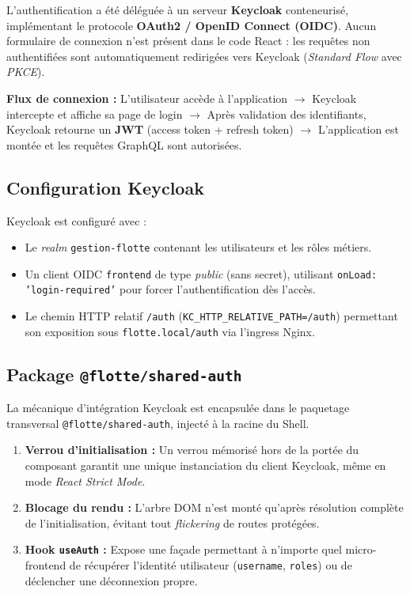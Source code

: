 \documentclass[12pt,a4paper]{article}
\begin{document}
L'authentification a \'{e}t\'{e} d\'{e}l\'{e}gu\'{e}e \`{a} un serveur \textbf{Keycloak} conteneuris\'{e}, impl\'{e}mentant le protocole \textbf{OAuth2 / OpenID Connect (OIDC)}. Aucun formulaire de connexion n'est pr\'{e}sent dans le code React : les requ\^{e}tes non authentifi\'{e}es sont automatiquement redirig\'{e}es vers Keycloak (\textit{Standard Flow} avec \textit{PKCE}).

\begin{infobox}
\textbf{Flux de connexion :} L'utilisateur acc\`{e}de \`{a} l'application $\rightarrow$ Keycloak intercepte et affiche sa page de login $\rightarrow$ Apr\`{e}s validation des identifiants, Keycloak retourne un \textbf{JWT} (access token + refresh token) $\rightarrow$ L'application est mont\'{e}e et les requ\^{e}tes GraphQL sont autoris\'{e}es.
\end{infobox}

\subsection{Configuration Keycloak}

Keycloak est configur\'{e} avec :
\begin{itemize}[leftmargin=*]
  \item Le \textit{realm} \texttt{gestion-flotte} contenant les utilisateurs et les r\^{o}les m\'{e}tiers.
  \item Un client OIDC \texttt{frontend} de type \textit{public} (sans secret), utilisant \texttt{onLoad: 'login-required'} pour forcer l'authentification d\`{e}s l'acc\`{e}s.
  \item Le chemin HTTP relatif \texttt{/auth} (\texttt{KC\_HTTP\_RELATIVE\_PATH=/auth}) permettant son exposition sous \texttt{flotte.local/auth} via l'ingress Nginx.
\end{itemize}

\subsection{Package \texttt{@flotte/shared-auth}}

La m\'{e}canique d'int\'{e}gration Keycloak est encapsul\'{e}e dans le paquetage transversal \texttt{@flotte/shared-auth}, inject\'{e} \`{a} la racine du Shell.

\begin{enumerate}[leftmargin=*]
  \item \textbf{Verrou d'initialisation :} Un verrou m\'{e}moris\'{e} hors de la port\'{e}e du composant garantit une unique instanciation du client Keycloak, m\^{e}me en mode \textit{React Strict Mode}.
  \item \textbf{Blocage du rendu :} L'arbre DOM n'est mont\'{e} qu'apr\`{e}s r\'{e}solution compl\`{e}te de l'initialisation, \'{e}vitant tout \textit{flickering} de routes prot\'{e}g\'{e}es.
  \item \textbf{Hook \texttt{useAuth} :} Expose une fa\c{c}ade permettant \`{a} n'importe quel micro-frontend de r\'{e}cup\'{e}rer l'identit\'{e} utilisateur (\texttt{username}, \texttt{roles}) ou de d\'{e}clencher une d\'{e}connexion propre.
\end{enumerate}
\end{document}
